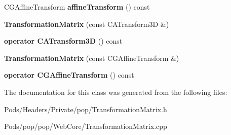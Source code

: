 \begin{DoxyCompactItemize}
C\+G\+Affine\+Transform {\bfseries affine\+Transform} () const
\item 
\mbox{\label{class_web_core_1_1_transformation_matrix_a8b7856b0bec3a13b937b4c09d52e662d}} 
{\bfseries Transformation\+Matrix} (const C\+A\+Transform3D \&)
\item 
\mbox{\label{class_web_core_1_1_transformation_matrix_a01e0f378f3e3fe395ce7639ca4a203b6}} 
{\bfseries operator C\+A\+Transform3D} () const
\item 
\mbox{\label{class_web_core_1_1_transformation_matrix_a3e1120e8e7e3cdec1d2f034f644c1139}} 
{\bfseries Transformation\+Matrix} (const C\+G\+Affine\+Transform \&)
\item 
\mbox{\label{class_web_core_1_1_transformation_matrix_a069d426c3fcb6e88bf07942488e95e17}} 
{\bfseries operator C\+G\+Affine\+Transform} () const
\end{DoxyCompactItemize}


The documentation for this class was generated from the following files\+:\begin{DoxyCompactItemize}
\item 
Pods/\+Headers/\+Private/pop/Transformation\+Matrix.\+h\item 
Pods/pop/pop/\+Web\+Core/Transformation\+Matrix.\+cpp\end{DoxyCompactItemize}
